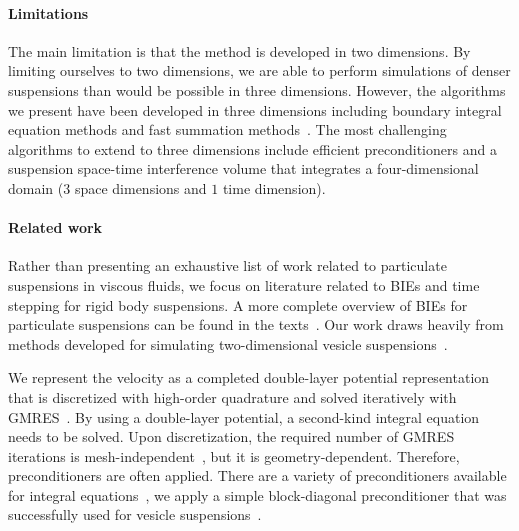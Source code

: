 \documentclass[preprint, 10pt]{elsarticle}
\begin{document}
\paragraph{Limitations} The main limitation is that the method is
developed in two dimensions.  By limiting ourselves to two dimensions,
we are able to perform simulations of denser suspensions  than would be
possible in three dimensions.  However, the algorithms we present have
been developed in three dimensions including boundary integral equation
methods and fast summation methods~\cite{cor-gre-rac-vee2017,
kli-tor2014, kli-tor2016}.  The most challenging algorithms to extend to
three dimensions include efficient preconditioners and a suspension
space-time interference volume that integrates a four-dimensional domain
($3$ space dimensions and $1$ time dimension).


\paragraph{Related work} Rather than presenting an exhaustive list of
work related to particulate suspensions in viscous fluids, we focus on
literature related to BIEs and time stepping for rigid body suspensions.
A more complete overview of BIEs for particulate suspensions can be
found in the texts~\cite{Pozrikidis1992, Guazzelli2011, Karrila1991}.
Our work draws heavily from methods developed for simulating
two-dimensional vesicle suspensions~\cite{Quaife2014, Quaife2015,
qua-bir2016, Rahimian2010, Lu2017}.  

We represent the velocity as a completed double-layer potential
representation~\cite{Power1987, Power1993, Karrila1989} that is
discretized with high-order quadrature and solved iteratively with
GMRES~\cite{Saad1986}.  By using a double-layer potential, a second-kind
integral equation needs to be solved.  Upon discretization, the required
number of GMRES iterations is mesh-independent~\cite{Campbell1996}, but
it is geometry-dependent.  Therefore, preconditioners are often applied.
There are a variety of preconditioners available for integral
equations~\cite{cou-pou-dar2017, che2000, qua-cou-dar2018, Quaife2015a,
bra-lub1990, hem-sch1981}, we apply a simple block-diagonal
preconditioner that was successfully used for vesicle
suspensions~\cite{Quaife2014}.
\end{document}
